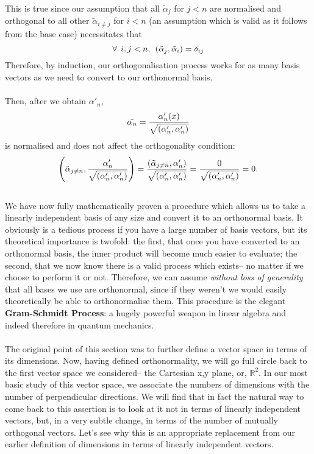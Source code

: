 This is true since our assumption that all $\tilde{\alpha}_{j}$ for $j<n$ are normalised and orthogonal to all other $\tilde{\alpha}_{i\neq j}$ for $i<n$ (an assumption which is valid as it follows from the base case) necessitates that 
$$
\forall\:\: i,j < n, \:\: \left(\tilde{\alpha}_{j},\tilde{\alpha}_{i}\right)= \delta_{ij}
$$
Therefore, by induction, our orthogonalisation process works for as many basis vectors as we need to convert to our orthonormal basis.
\\\\
Then, after we obtain $\alpha'_{n}$,
$$
\tilde{\alpha_{n}}=\frac{\alpha'_{n}(x)}{\sqrt{\left(\alpha'_{n},\alpha'_{n}\right)}}
$$
is normalised and does not affect the orthogonality condition:
$$
\left(\tilde{\alpha}_{j\neq n}, \frac{\alpha'_{n}}{\sqrt{\left(\alpha'_{n},\alpha'_{n}\right)}}\right)=\frac{\left(\tilde{\alpha}_{j\neq n},\alpha'_{n}\right)}{\sqrt{\left(\alpha'_{n},\alpha'_{n}\right)}}= \frac{0}{\sqrt{\left(\alpha'_{n},\alpha'_{n}\right)}}=0.
$$
\\
We have now fully mathematically proven a procedure which allows us to take a linearly independent basis of any size and convert it to an orthonormal basis. It obviously is a tedious process if you have a large number of basis vectors, but its theoretical importance is twofold: the first, that once you have converted to an orthonormal basis, the inner product will become much easier to evaluate; the second, that we now know there is a valid process which exists-- no matter if we choose to perform it or not. Therefore, we can assume \textit{without loss of generality} that all bases we use are orthonormal, since if they weren't we would easily theoretically be able to orthonormalise them. This procedure is the elegant \textbf{Gram-Schmidt Process}: a hugely powerful weapon in linear algebra and indeed therefore in quantum mechanics.
\\\\
The original point of this section was to further define a vector space in terms of its dimensions. Now, having defined orthonormality, we will go full circle back to the first vector space we considered-- the Cartesian x,y plane, or, $\mathbb{R}^2$. In our most basic study of this vector space, we associate the numbers of dimensions with the number of perpendicular directions. We will find that in fact the natural way to come back to this assertion is to look at it not in terms of linearly independent vectors, but, in a very subtle change, in terms of the number of mutually orthogonal vectors. Let's see why this is an appropriate replacement from our earlier definition of dimensions in terms of linearly independent vectors.
